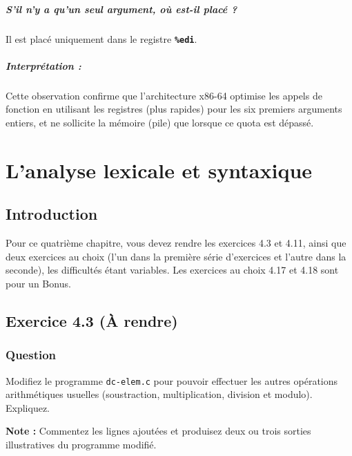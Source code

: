 \paragraph{S’il n’y a qu’un seul argument, où est-il placé ?}
Il est placé uniquement dans le registre \textbf{\texttt{\%edi}}.

\paragraph{Interprétation :}
Cette observation confirme que l'architecture x86-64 optimise les appels de fonction en utilisant les registres (plus rapides) pour les six premiers arguments entiers, et ne sollicite la mémoire (pile) que lorsque ce quota est dépassé.

\chapter{L'analyse lexicale et syntaxique}
\section*{Introduction}
Pour ce quatrième chapitre, vous devez rendre les exercices 4.3 et 4.11, ainsi que deux exercices au choix (l’un dans la première série d’exercices et l’autre dans la seconde), les difficultés étant variables. Les exercices au choix 4.17 et 4.18 sont pour un Bonus.

\section{Exercice 4.3 (À rendre)}
\subsection{Question}
Modifiez le programme \texttt{dc-elem.c} pour pouvoir effectuer les autres opérations arithmétiques usuelles (soustraction, multiplication, division et modulo). Expliquez.

\textbf{Note :} Commentez les lignes ajoutées et produisez deux ou trois sorties illustratives du programme modifié.

